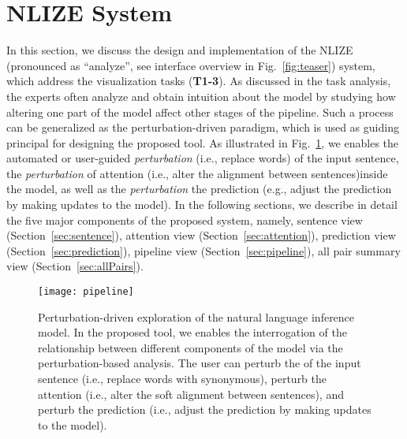 \section{NLIZE System}
In this section, we discuss the design and implementation of the NLIZE (pronounced as ``analyze'', see interface overview in Fig.~\ref{fig:teaser}) system, which address the visualization tasks (\textbf{T1-3}).
%
As discussed in the task analysis, the experts often analyze and obtain intuition about the model by studying how altering one part of the model affect other stages of the pipeline.
%
Such a process can be generalized as the perturbation-driven paradigm, which is used as guiding principal for designing the proposed tool.
%
As illustrated in Fig.~\ref{fig:modelPipeline}, we enables the automated or user-guided \emph{perturbation} (i.e., replace words) of the input sentence, the \emph{perturbation} of attention (i.e., alter the alignment between sentences)inside the model, as well as the \emph{perturbation} the prediction (e.g., adjust the prediction by making updates to the model).
%
In the following sections, we describe in detail the five major components of the proposed system, namely, sentence view  (Section~\ref{sec:sentence}), attention view (Section~\ref{sec:attention}), prediction view (Section~\ref{sec:prediction}), pipeline view (Section~\ref{sec:pipeline}), all pair summary view (Section~\ref{sec:allPairs}).


\begin{figure}[htbp]
\centering
 \texttt{[image: pipeline]}
 \caption{
 Perturbation-driven exploration of the natural language inference model.
 In the proposed tool, we enables the interrogation of the relationship between different components of the model via the perturbation-based analysis.
 The user can perturb the of the input sentence (i.e., replace words with synonymous), perturb the attention (i.e., alter the soft alignment between sentences), and perturb the prediction (i.e., adjust the prediction by making updates to the model).
}
\label{fig:modelPipeline}
\end{figure}

%
